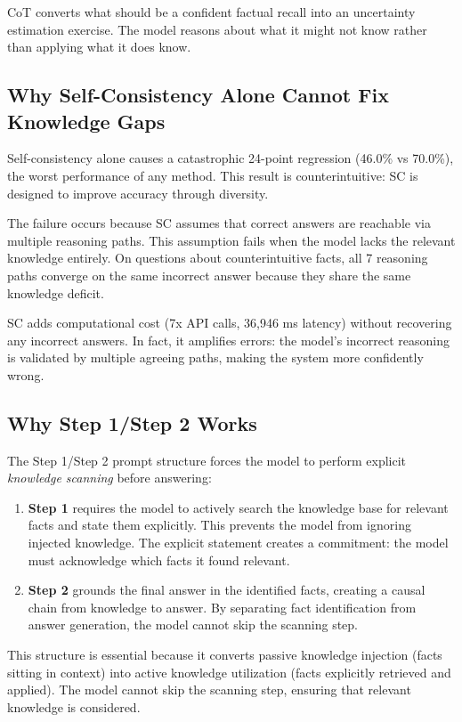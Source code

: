 CoT converts what should be a confident factual recall into an uncertainty estimation exercise. The model reasons about what it might not know rather than applying what it does know.

\subsection{Why Self-Consistency Alone Cannot Fix Knowledge Gaps}

Self-consistency alone causes a catastrophic 24-point regression (46.0\% vs 70.0\%), the worst performance of any method. This result is counterintuitive: SC is designed to improve accuracy through diversity.

The failure occurs because SC assumes that correct answers are reachable via multiple reasoning paths. This assumption fails when the model lacks the relevant knowledge entirely. On questions about counterintuitive facts, all 7 reasoning paths converge on the same incorrect answer because they share the same knowledge deficit.

SC adds computational cost (7x API calls, 36,946 ms latency) without recovering any incorrect answers. In fact, it amplifies errors: the model's incorrect reasoning is validated by multiple agreeing paths, making the system more confidently wrong.

\subsection{Why Step 1/Step 2 Works}

The Step 1/Step 2 prompt structure forces the model to perform explicit \emph{knowledge scanning} before answering:

\begin{enumerate}
\item \textbf{Step 1} requires the model to actively search the knowledge base for relevant facts and state them explicitly. This prevents the model from ignoring injected knowledge. The explicit statement creates a commitment: the model must acknowledge which facts it found relevant.

\item \textbf{Step 2} grounds the final answer in the identified facts, creating a causal chain from knowledge to answer. By separating fact identification from answer generation, the model cannot skip the scanning step.
\end{enumerate}

This structure is essential because it converts passive knowledge injection (facts sitting in context) into active knowledge utilization (facts explicitly retrieved and applied). The model cannot skip the scanning step, ensuring that relevant knowledge is considered.

